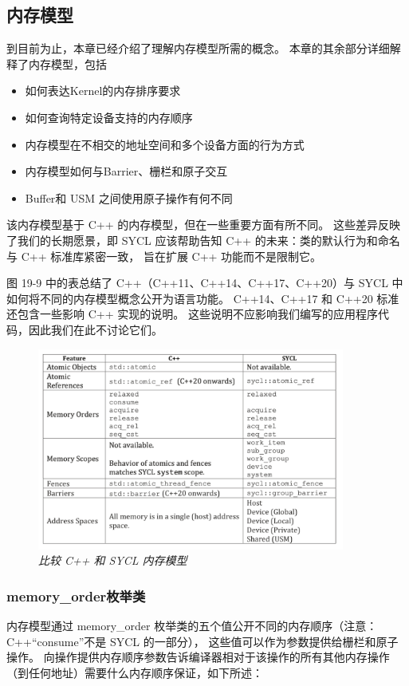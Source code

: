 \subsection{内存模型}
到目前为止，本章已经介绍了理解内存模型所需的概念。 本章的其余部分详细解释了内存模型，包括

\begin{itemize}
	\item 如何表达Kernel的内存排序要求

	\item 如何查询特定设备支持的内存顺序

	\item 内存模型在不相交的地址空间和多个设备方面的行为方式

	\item 内存模型如何与Barrier、栅栏和原子交互

	\item Buffer和 USM 之间使用原子操作有何不同
\end{itemize}

该内存模型基于 C++ 的内存模型，但在一些重要方面有所不同。 
这些差异反映了我们的长期愿景，即 SYCL 应该帮助告知 C++ 的未来：类的默认行为和命名与 C++ 标准库紧密一致，
旨在扩展 C++ 功能而不是限制它。

图 19-9 中的表总结了 C++（C++11、C++14、C++17、C++20）与 SYCL 中如何将不同的内存模型概念公开为语言功能。 
C++14、C++17 和 C++20 标准还包含一些影响 C++ 实现的说明。 
这些说明不应影响我们编写的应用程序代码，因此我们在此不讨论它们。

\begin{figure}[H]
	\centering
	\includegraphics[width=0.9\textwidth]{figs/F19.9.png}
	\caption{\textit{比较 C++ 和 SYCL 内存模型 }}
\end{figure}

\subsubsection{memory\_order枚举类}
内存模型通过 memory\_order 枚举类的五个值公开不同的内存顺序（注意：C++“consume”不是 SYCL 的一部分），
这些值可以作为参数提供给栅栏和原子操作。 
向操作提供内存顺序参数告诉编译器相对于该操作的所有其他内存操作（到任何地址）需要什么内存顺序保证，如下所述：

